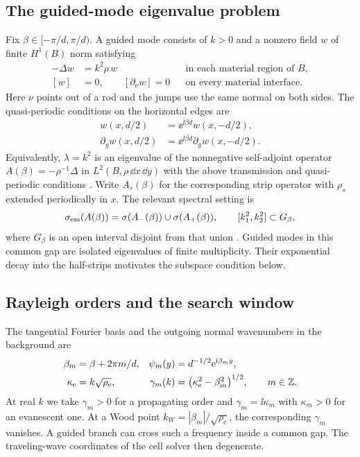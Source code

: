 \subsection{The guided-mode eigenvalue problem}\label{sec:spectral}
Fix $\beta\in[-\pi/d,\pi/d)$. A guided mode consists of $k>0$ and
a nonzero field $w$ of finite $H^1(B)$ norm satisfying
\begin{equation}\label{eq:guided}
 \begin{aligned}
 -\Delta w&=k^2\rho\,w &&\text{in each material region of } B,\\
 [w]&=0,\qquad [\partial_\nu w]=0 &&\text{on every material interface}.
 \end{aligned}
\end{equation}
Here $\nu$ points out of a rod and the jumps use the same normal on both
sides. The quasi-periodic conditions on the horizontal edges are
\begin{equation}\label{eq:qp-edges}
 \begin{aligned}
 w(x,d/2)&=\ee^{\ii\beta d}w(x,-d/2),\\
 \partial_y w(x,d/2)&=\ee^{\ii\beta d}\partial_y w(x,-d/2).
 \end{aligned}
\end{equation}
Equivalently, $\lambda=k^2$ is an eigenvalue of the nonnegative
self-adjoint operator $A(\beta)=-\rho^{-1}\Delta$ in $L^2(B,\rho\,\dd x\,\dd y)$
with the above transmission and quasi-periodic conditions \cite{Fliss2013}.
Write $A_s(\beta)$ for the corresponding strip operator with $\rho_s$
extended periodically in $x$. The relevant spectral setting is
\begin{equation}\label{eq:common-gap}
 \sigma_{\rm ess}(A(\beta))
 =\sigma(A_-(\beta))\cup\sigma(A_+(\beta)),\qquad
 [k_1^2,k_2^2]\subset G_\beta ,
\end{equation}
where $G_\beta$ is an open interval disjoint from that union
\cite[Prop.~2.1]{KlindworthSchmidtFliss2014}. Guided modes in this common
gap are isolated eigenvalues of finite multiplicity. Their exponential
decay into the half-strips motivates the subspace condition below.

\subsection{Rayleigh orders and the search window}\label{sec:rayleigh}
The tangential Fourier basis and the outgoing normal wavenumbers in the
background are
\begin{equation}\label{eq:gamma}
 \begin{aligned}
 \beta_m&=\beta+2\pi m/d, &\psi_m(y)&=d^{-1/2}\mathrm{e}^{\mathrm{i}\beta_m y},\\
 \kappa_{\mathrm e}&=k\sqrt{\rho_{\mathrm e}},&
 \gamma_m(k)&=\bigl(\kappa_{\mathrm e}^2-\beta_m^2\bigr)^{1/2},
 \qquad m\in\mathbb{Z} .
 \end{aligned}
\end{equation}
At real $k$ we take $\gamma_m>0$ for a propagating order and
$\gamma_m=\ii\kappa_m$ with $\kappa_m>0$ for an evanescent one. At a Wood
point $k_W=|\beta_m|/\sqrt{\rho_{\mathrm e}}$, the corresponding
$\gamma_m$ vanishes. A guided branch can cross such a frequency inside a
common gap. The traveling-wave coordinates of the cell solver then
degenerate.

